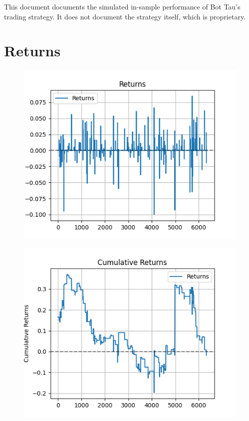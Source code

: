 \documentclass[a4paper]{article}
\title{\documenttitle}
\date{\today}
\author{Frans Englich \\
        \href{mailto:fenglich@fastmail.fm}{fenglich@fastmail.fm}}
\begin{document}
\maketitle

This document documents the simulated in-sample performance of Bot Tau's trading
strategy. It does not document the strategy itself, which is proprietary.

\section{Returns}

\begin{figure}[H]
    \begin{center}
        \includegraphics{../generated/returns.png}
    \end{center}
\end{figure}

\begin{figure}[H]
    \begin{center}
        \includegraphics{../generated/cumulative_returns.png}
    \end{center}
\end{figure}
\end{document}
